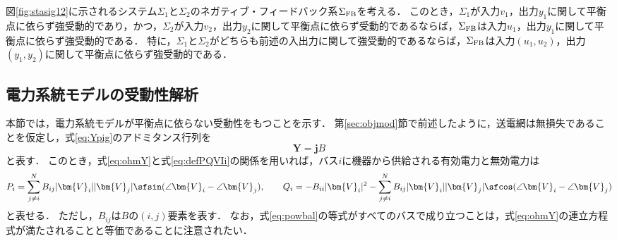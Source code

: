 \documentclass[a4j,10pt,oneside,openany,dvipdfmx]{jsbook}
\begin{document}
\begin{theorem}\label{thm:eipsthm}
図\ref{fig:stasig12}に示されるシステム$\Sigma_1$と$\Sigma_2$のネガティブ・フィードバック系$\Sigma_{\rm FB}$を考える．
このとき，$\Sigma_1$が入力$v_1$，出力$y_1$に関して平衡点に依らず強受動的であり，かつ，$\Sigma_2$が入力$v_2$，出力$y_2$に関して平衡点に依らず受動的であるならば，$\Sigma_{\rm FB}$は入力$u_1$，出力$y_1$に関して平衡点に依らず強受動的である．
特に，$\Sigma_1$と$\Sigma_2$がどちらも前述の入出力に関して強受動的であるならば，$\Sigma_{\rm FB}$は入力$(u_1,u_2)$，出力$(y_1,y_2)$に関して平衡点に依らず強受動的である．
\end{theorem}


\subsection{電力系統モデルの受動性解析}\label{sec:psanpw}

本節では，電力系統モデルが平衡点に依らない受動性をもつことを示す．
第\ref{sec:objmod}節で前述したように，送電網は無損失であることを仮定し，式\eqref{eq:Ypig}のアドミタンス行列を
\[
\bm{Y}=\bm{j}B
\]
と表す．
このとき，式\eqref{eq:ohmY}と式\eqref{eq:defPQVIi}の関係を用いれば，バス$i$に機器から供給される有効電力と無効電力は
\begin{equation}\label{eq:powbal}
P_i = \sum_{j\neq i}^{N} B_{ij} |\bm{V}_i| |\bm{V}_j| \sfsin(\angle \bm{V}_i -\angle \bm{V}_j)
,\qquad
Q_i = - B_{ii} |\bm{V}_i|^2 -
\sum_{j\neq i}^{N} B_{ij} |\bm{V}_i| |\bm{V}_j| \sfcos(\angle \bm{V}_i -\angle \bm{V}_j)
\end{equation}
と表せる．
ただし，$B_{ij}$は$B$の$(i,j)$要素を表す．
なお，式\eqref{eq:powbal}の等式がすべてのバスで成り立つことは，式\eqref{eq:ohmY}の連立方程式が満たされることと等価であることに注意されたい．
\end{document}
